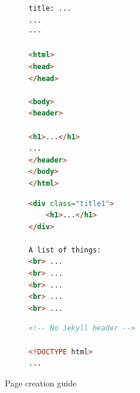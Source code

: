 \documentclass[10pt]{beamer}
\begin{document}
\begin{frame}[fragile]
\begin{figure}[h]
\begin{lstlisting}[language=html]
title: ...
...
---

<html>
<head>
</head>

<body>
<header>

<h1>...</h1>
...
</header>
</body>
</html>
\end{lstlisting}
\end{figure}
\end{frame}

\begin{frame}[fragile]
\begin{figure}[h]
\begin{lstlisting}[language=html]
<div class="title1">
    <h1>...</h1>
</div>

A list of things:
<br> ...
<br> ...
<br> ...
<br> ...
<br> ...
\end{lstlisting}
\end{figure}
\end{frame}

\begin{frame}[fragile]
\begin{figure}[h]
\begin{lstlisting}[language=html]
<!-- No Jekyll header -->

<!DOCTYPE html>
...
\end{lstlisting}
\end{figure}
\end{frame}

\begin{frame}{Page creation guide}
\vfill{}\vfill
\end{frame}
\end{document}

